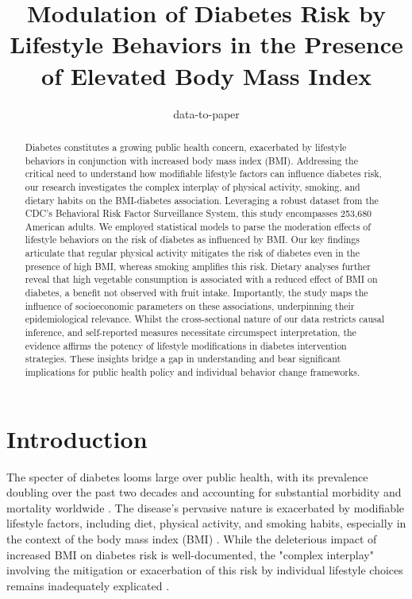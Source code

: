 \documentclass[11pt]{article}
\title{Modulation of Diabetes Risk by Lifestyle Behaviors in the Presence of Elevated Body Mass Index}
\author{data-to-paper}
\begin{document}
\maketitle
\begin{abstract}
Diabetes constitutes a growing public health concern, exacerbated by lifestyle behaviors in conjunction with increased body mass index (BMI). Addressing the critical need to understand how modifiable lifestyle factors can influence diabetes risk, our research investigates the complex interplay of physical activity, smoking, and dietary habits on the BMI-diabetes association. Leveraging a robust dataset from the CDC's Behavioral Risk Factor Surveillance System, this study encompasses 253,680 American adults. We employed statistical models to parse the moderation effects of lifestyle behaviors on the risk of diabetes as influenced by BMI. Our key findings articulate that regular physical activity mitigates the risk of diabetes even in the presence of high BMI, whereas smoking amplifies this risk. Dietary analyses further reveal that high vegetable consumption is associated with a reduced effect of BMI on diabetes, a benefit not observed with fruit intake. Importantly, the study maps the influence of socioeconomic parameters on these associations, underpinning their epidemiological relevance. Whilst the cross-sectional nature of our data restricts causal inference, and self-reported measures necessitate circumspect interpretation, the evidence affirms the potency of lifestyle modifications in diabetes intervention strategies. These insights bridge a gap in understanding and bear significant implications for public health policy and individual behavior change frameworks.
\end{abstract}
\section*{Introduction}

The specter of diabetes looms large over public health, with its prevalence doubling over the past two decades and accounting for substantial morbidity and mortality worldwide \cite{Chiu2011DerivingEB, Singh2013TheAQ}. The disease's pervasive nature is exacerbated by modifiable lifestyle factors, including diet, physical activity, and smoking habits, especially in the context of the body mass index (BMI) \cite{Chan1994ObesityFD, Chen2018AssociationOB, Gray2015RelationBB}. While the deleterious impact of increased BMI on diabetes risk is well-documented, the "complex interplay" involving the mitigation or exacerbation of this risk by individual lifestyle choices remains inadequately explicated \cite{Pi-Sunyer2007ReductionIW, Wing2011BenefitsOM}.
\end{document}

